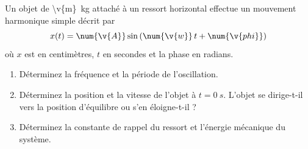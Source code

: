 Un objet de \qty{\v{m}}{kg} attaché à un ressort horizontal effectue un mouvement harmonique simple décrit par
\[ x(t) = \num{\v{A}} \sin\left(\num{\v{w}}\, t + \num{\v{phi}}\right) \]
où $x$ est en centimètres, $t$ en secondes et la phase en radians.

\begin{enumerate}[label=\alph*)]
    \item Déterminez la fréquence et la période de l'oscillation.
    \item Déterminez la position et la vitesse de l'objet à $t = \qty{0}{s}$. L'objet se dirige-t-il vers la position d'équilibre ou s'en éloigne-t-il ?
    \item Déterminez la constante de rappel du ressort et l'énergie mécanique du système.
\end{enumerate}
